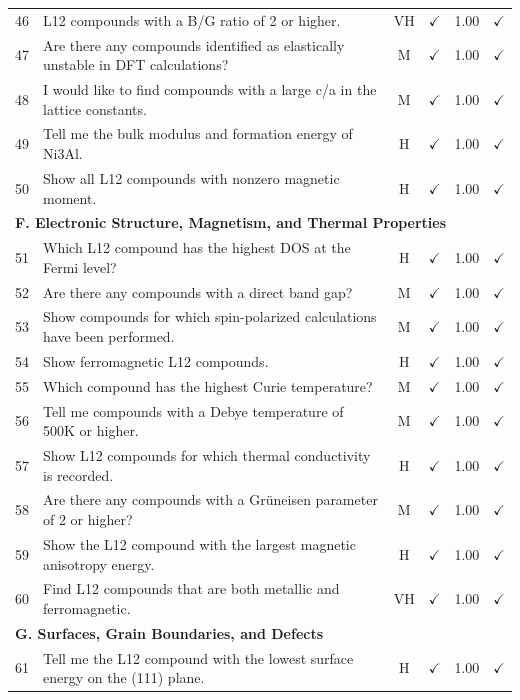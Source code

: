 \documentclass[5p,twocolumn]{elsarticle}
\begin{document}
\begin{longtable}{clcccl}
    46 & L12 compounds with a B/G ratio of 2 or higher. & VH & $\checkmark$ & 1.00 & $\checkmark$ \\
    47 & Are there any compounds identified as elastically unstable in DFT calculations? & M & $\checkmark$ & 1.00 & $\checkmark$ \\
    48 & I would like to find compounds with a large c/a in the lattice constants. & M & $\checkmark$ & 1.00 & $\checkmark$ \\
    49 & Tell me the bulk modulus and formation energy of Ni3Al. & H & $\checkmark$ & 1.00 & $\checkmark$ \\
    50 & Show all L12 compounds with nonzero magnetic moment. & H & $\checkmark$ & 1.00 & $\checkmark$ \\
    \midrule
    \multicolumn{6}{l}{\textbf{F. Electronic Structure, Magnetism, and Thermal Properties}} \\
    \midrule
    51 & Which L12 compound has the highest DOS at the Fermi level? & H & $\checkmark$ & 1.00 & $\checkmark$ \\
    52 & Are there any compounds with a direct band gap? & M & $\checkmark$ & 1.00 & $\checkmark$ \\
    53 & Show compounds for which spin-polarized calculations have been performed. & M & $\checkmark$ & 1.00 & $\checkmark$ \\
    54 & Show ferromagnetic L12 compounds. & H & $\checkmark$ & 1.00 & $\checkmark$ \\
    55 & Which compound has the highest Curie temperature? & M & $\checkmark$ & 1.00 & $\checkmark$ \\
    56 & Tell me compounds with a Debye temperature of 500K or higher. & M & $\checkmark$ & 1.00 & $\checkmark$ \\
    57 & Show L12 compounds for which thermal conductivity is recorded. & H & $\checkmark$ & 1.00 & $\checkmark$ \\
    58 & Are there any compounds with a Grüneisen parameter of 2 or higher? & M & $\checkmark$ & 1.00 & $\checkmark$ \\
    59 & Show the L12 compound with the largest magnetic anisotropy energy. & H & $\checkmark$ & 1.00 & $\checkmark$ \\
    60 & Find L12 compounds that are both metallic and ferromagnetic. & VH & $\checkmark$ & 1.00 & $\checkmark$ \\
    \midrule
    \multicolumn{6}{l}{\textbf{G. Surfaces, Grain Boundaries, and Defects}} \\
    \midrule
    61 & Tell me the L12 compound with the lowest surface energy on the (111) plane. & H & $\checkmark$ & 1.00 & $\checkmark$ \\

\end{longtable}
\end{document}
